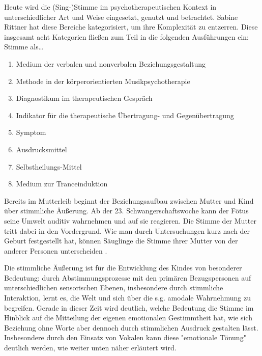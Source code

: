 Heute wird die (Sing-)Stimme im psychotherapeutischen Kontext in unterschiedlicher Art und Weise eingesetzt, genutzt und betrachtet. Sabine Rittner \autocite[vgl.][204 ff.]{rittner2008} hat diese Bereiche kategorisiert, um ihre Komplexität zu entzerren. Diese insgesamt acht Kategorien fließen zum Teil in die folgenden Ausführungen ein: 
Stimme als\ldots
\begin{enumerate}
\item Medium der verbalen und nonverbalen Beziehungsgestaltung
\item Methode in der körperorientierten Musikpsychotherapie
\item Diagnostikum im therapeutischen Gespräch
\item Indikator für die therapeutische Übertragung- und Gegenübertragung
\item Symptom
\item Ausdrucksmittel
\item Selbstheilungs-Mittel
\item Medium zur Tranceinduktion
\end{enumerate}

Bereits im Mutterleib beginnt der Beziehungsaufbau zwischen Mutter und Kind über stimmliche Äußerung. Ab der 23. Schwangerschaftswoche kann der Fötus seine Umwelt auditiv wahrnehmen und auf sie reagieren. Die Stimme der Mutter tritt dabei in den Vordergrund. Wie man durch Untersuchungen kurz nach der Geburt festgestellt hat, können Säuglinge die Stimme ihrer Mutter von der anderer Personen unterscheiden \autocite [vgl.][22f]{noecker-ribeaupierre2004}. 

Die stimmliche Äußerung ist für die Entwicklung des Kindes von besonderer Bedeutung: durch Abstimmungsprozesse mit den primären Bezugspersonen auf unterschiedlichen sensorischen Ebenen, insbesondere durch stimmliche Interaktion, lernt es, die Welt und sich über die s.g. amodale Wahrnehmung zu begreifen. Gerade in dieser Zeit wird deutlich, welche Bedeutung die Stimme im Hinblick auf die Mitteilung der eigenen emotionalen Gestimmtheit hat, wie sich Beziehung ohne Worte aber dennoch durch stimmlichen Ausdruck gestalten lässt. Insbesondere durch den Einsatz von Vokalen kann diese "emotionale Tönung" \autocite[205]{rittner2008} deutlich werden, wie weiter unten näher erläutert wird.

